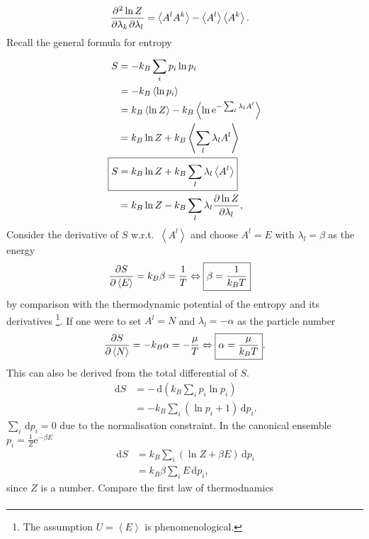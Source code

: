 \documentclass[a4paper,10pt]{article}
\newcommand{\td}{\,\text{d}}
\numberwithin{equation}{section}
\begin{document}
\begin{multicols}{2}
\begin{align}
  \diffp[]{\ln Z}{\lambda _k,\lambda _l} &= \left\langle A^lA^k\right\rangle -\left\langle A^l\right\rangle \left\langle A^k\right\rangle 
.\end{align}
Recall the general formula for entropy
\begin{align} 
  S &= -k_B\sum_{i}^{}p_i\ln p_i\\
    &= -k_B\left\langle \ln p_i\right\rangle \\
    &= k_B\left\langle \ln Z\right\rangle -k_B\left\langle \ln \text{e}^{-\sum_{l}^{}\lambda _lA^l}\right\rangle \\
    &= k_B\ln Z + k_B\left\langle \sum_{l}^{}\lambda _lA^l\right\rangle \\
  \Aboxed{S &= k_B\ln Z + k_B\sum_{l}^{}\lambda _l\left\langle A^l\right\rangle }\\
    &= k_B\ln Z - k_B\sum_{l}^{}\lambda _l\diffp[]{\ln Z}{\lambda _l}
,\end{align} 
Consider the derivative of $S$ w.r.t.\ $\left\langle A^l\right\rangle $ and choose $A^l=E$ with $\lambda _l=\beta $ as the energy
\begin{align} 
  \diffp[]{S}{\left\langle E\right\rangle } &= k_B\beta =\dfrac{1}{T}\Leftrightarrow \boxed{\beta =\dfrac{1}{k_BT}}
\end{align} 
by comparison with the thermodynamic potential of the entropy and its derivatives
\footnote{The assumption $U=\left\langle E\right\rangle $ is phenomenological.}.
If one were to set $A^l=N$ and $\lambda _l=-\alpha $ as the particle number
\begin{align} 
  \diffp[]{S}{\left\langle N\right\rangle }=-k_B\alpha =-\dfrac{\mu }{T}\Leftrightarrow \boxed{\alpha =\dfrac{\mu }{k_BT}}
.\end{align} 
This can also be derived from the total differential of $S$.
\begin{align} 
  \td S &= -\td \left(k_B\sum_{i}^{}p_i\ln p_i\right)\\
        &= -k_B\sum_{i}^{}\left(\ln p_i + 1\right)\td p_i
.\end{align} 
$\sum_{i}^{}\td p_i=0$ due to the normalisation constraint.
In the canonical ensemble $p_i = \tfrac{1}{Z}\text{e}^{-\beta E}$
\begin{align} 
  \td S &= k_B\sum_{i}^{}\left(\ln Z + \beta E\right)\td p_i\\
        &= k_B\beta \sum_{i}^{}E\td p_i
,\end{align}
since $Z$ is a number.
Compare the first law of thermodnamics
\begin{align} 

\end{align}
\end{multicols}
\end{document}
